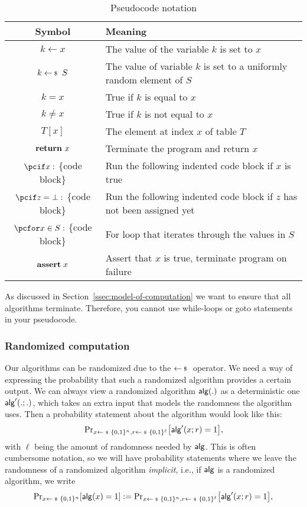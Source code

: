 \begin{table}
\begin{center}
\begin{tabular}{c | l}
    Symbol & Meaning \\ \hline
    $k \gets x$ & The value of the variable $k$ is set to $x$ \\
    $k \sample S$ & The value of variable $k$ is set to a uniformly random element of $S$ \\
    $k = x$ & True if $k$ is equal to $x$ \\
    $k \neq x$ & True if $k$ is not equal to $x$ \\
    $T[x]$ & The element at index $x$ of table $T$ \\
    $\mathbf{return}\  x$ & Terminate the program and return $x$ \\
    $\pcif x:$ \{code block\} & Run the following indented code block if $x$ is true\\
    $\pcif z=\bot:$ \{code block\} & Run the following indented code block if $z$ has not been assigned yet\\
    $\pcfor x \in S:$ \{code block\} & For loop that iterates through the values in $S$\\
    $\mathbf{assert}\; x$ & Assert that $x$ is true, terminate program on failure\\
\end{tabular}
\end{center}
\caption{Pseudocode notation}\label{table:pseudocode-notation}
\end{table}

As discussed in Section~\ref{ssec:model-of-computation} we want to ensure that all algorithms terminate. Therefore, you cannot use while-loops or goto statements in your pseudocode.


\subsubsection{Randomized computation}\label{sssec:randomized-algorithms}
Our algorithms can be randomized due to the $\sample$ operator. We need a way of expressing the probability that such a randomized algorithm provides a certain output. We can always view a randomized algorithm $\mathsf{alg}(.)$ as a deterministic one $\mathsf{alg}'(.;.)$, which takes an extra input that models the randomness the algorithm uses. Then a probability statement about the algorithm would look like this:
\[\probsub{x\sample \bin^n,r\sample\bin^\ell}{\alg'(x;r)=1},\]
with $\ell$ being the amount of randomness needed by $\mathsf{alg}$. This is often cumbersome notation, so we will have probability statements where we leave the randomness of a randomized algorithm \emph{implicit}, i.e., if $\mathsf{alg}$ is a randomized algorithm, we write
\[\probsub{x\sample \bin^n}{\alg(x)=1}:=
\probsub{x\sample \bin^n,r\sample\bin^\ell}{\alg'(x;r)=1},\]